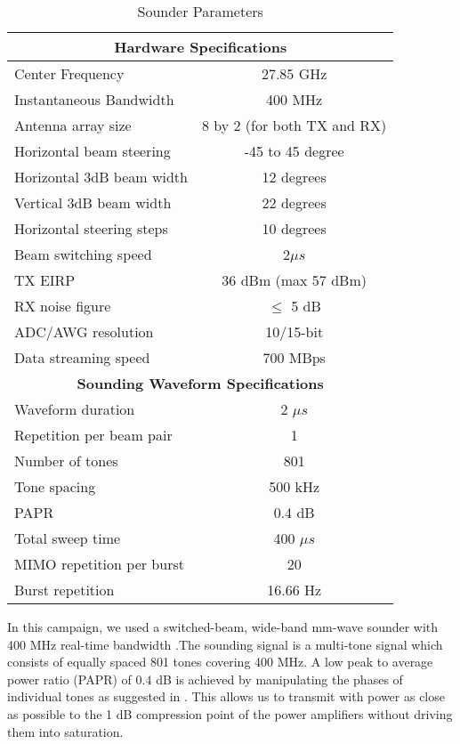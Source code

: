 \documentclass[conference]{IEEEtran}
\begin{document}
  \begin{table}[tbp]\centering
\small
  \caption{Sounder Parameters}
  \renewcommand{\arraystretch}{1.2}
\begin{tabular}{l|c}
    \hline
    \multicolumn{2}{c}{\textbf{Hardware Specifications}} \\ \hline \hline
    Center Frequency & 27.85 GHz\\
    Instantaneous Bandwidth & 400 MHz\\
    Antenna array size & 8 by 2 (for both TX and RX) \\
    Horizontal beam steering & -45 to 45 degree \\
    Horizontal 3dB beam width & 12 degrees\\
    Vertical 3dB beam width & 22 degrees\\
    Horizontal steering steps & 10 degrees\\
    Beam switching speed & 2$\mu s$ \\
    TX EIRP & 36 dBm (max 57 dBm) \\
    RX noise figure & $\le$ 5 dB \\ 
    ADC/AWG resolution & 10/15-bit \\
    Data streaming speed & 700 MBps \\ \hline
    \multicolumn{2}{c}{\textbf{Sounding Waveform Specifications}} \\ \hline \hline
    Waveform duration & 2 $\mu s$ \\
    Repetition per beam pair & 1 \\
    Number of tones & 801 \\
    Tone spacing & 500 kHz \\
    PAPR & 0.4 dB \\ 
    Total sweep time & 400 $\mu s$ \\ 
    MIMO repetition per burst & 20   \\ 
    Burst repetition & 16.66 Hz \\ \hline 
  \end{tabular} \label{specs}
\end{table}

In this campaign, we used a switched-beam, wide-band mm-wave sounder with 400 MHz real-time bandwidth \cite{bas_2017_realtime}.The sounding signal is a multi-tone signal which consists of equally spaced 801 tones covering 400 MHz. A low peak to average power ratio (PAPR) of $0.4$ dB is achieved by manipulating the phases of individual tones as suggested in \cite{Friese1997multitone}. This allows us to transmit with power as close as possible to the 1 dB compression point of the power amplifiers without driving them into saturation.  
\end{document}

